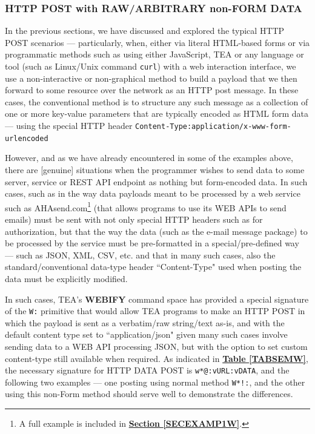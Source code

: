 \documentclass[a4paper, 18pt]{book} %
\begin{document}
{{{\subsubsection{HTTP POST with RAW/ARBITRARY non-FORM DATA}
\label{SECHTTPPOSTDATA}


In the previous sections, we have discussed and explored the typical HTTP POST scenarios --- particularly, when, either via literal HTML-based forms or via programmatic methods such as using either JavaScript, TEA or any language or tool (such as Linux/Unix command \texttt{curl}) with a web interaction interface, we use a non-interactive or non-graphical method to build a payload that we then forward to some resource over the network as an HTTP post message. In these cases, the conventional method is to structure any such message as a collection of one or more key-value parameters that are typically encoded as HTML form data --- using the special HTTP header \texttt{Content-Type:application/x-www-form-urlencoded}

\vspace{2em}


However, and as we have already encountered in some of the examples above, there are [genuine] situations when the programmer wishes to send data to some server, service or REST API endpoint as nothing but form-encoded data. In such cases, such as in the way data payloads meant to be processed by a web service such as AHAsend.com\footnote{A full example is included in \textbf{\hyperref[SECEXAMP1W]{Section \ref{SECEXAMP1W}}}.} (that allows programs to use its WEB APIs to send emails) must be sent with not only special HTTP headers such as for authorization, but that the way the data (such as the e-mail message package) to be processed by the service must be pre-formatted in a special/pre-defined way --- such as JSON, XML, CSV, etc. and that in many such cases, also the standard/conventional data-type header ``Content-Type" used when posting the data must be explicitly modified.

\vspace{2em} 

In such cases, TEA's \textbf{WEBIFY} command space has provided a special signature of the \texttt{W:} primitive that would allow TEA programs to make an HTTP POST in which the payload is sent as a verbatim/raw string/text as-is, and with the default content type set to ``application/json" given many such cases involve sending data to a WEB API processing JSON, but with the option to set custom content-type still available when required. As indicated in \textbf{\hyperref[TABSEMW]{Table \ref{TABSEMW}}}, the necessary signature for HTTP DATA POST is \texttt{w*@:vURL:vDATA}, and the following two examples --- one posting using normal method \texttt{W*!:}, and the other using this non-Form method should serve well to demonstrate the differences.


}}}
\end{document}
